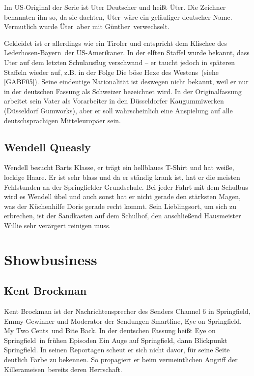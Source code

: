 Im US-Original der Serie ist Uter Deutscher und heißt Üter. Die Zeichner benannten ihn so, da sie dachten, \glqq Üter\grqq\ wäre ein geläufiger deutscher Name. Vermutlich wurde \glqq Üter\grqq\ aber mit \glqq Günther\grqq\ verwechselt.

Gekleidet ist er allerdings wie ein Tiroler und entspricht dem Klischee des \glqq Lederhosen-Bayern\grqq\ der US-Amerikaner. In der elften Staffel wurde bekannt, dass Uter auf dem letzten Schulausflug verschwand -- er taucht jedoch in späteren Staffeln wieder auf, z.B. in der Folge \glqq Die böse Hexe des Westens\grqq\ (siehe \ref{GABF05}). Seine eindeutige Nationalität ist deswegen nicht bekannt, weil er nur in der deutschen Fassung als Schweizer bezeichnet wird. In der Originalfassung arbeitet sein Vater als Vorarbeiter in den Düsseldorfer Kaugummiwerken (Düsseldorf Gumworks), aber er soll wahrscheinlich eine Anspielung auf alle deutschsprachigen Mitteleuropäer sein.

\subsection{Wendell Queasly}\label{WendellQueasly}
Wendell besucht Barts Klasse, er trägt ein hellblaues T-Shirt und hat weiße, lockige Haare. Er ist sehr blass und da er ständig krank ist, hat er die meisten Fehlstunden an der Springfielder Grundschule. Bei jeder Fahrt mit dem Schulbus wird es Wendell übel und auch sonst hat er nicht gerade den stärksten Magen, was der Küchenhilfe Doris gerade recht kommt. Sein Lieblingsort, um sich zu erbrechen, ist der Sandkasten auf dem Schulhof, den anschließend Hausmeister Willie sehr verärgert reinigen muss.

\section{Showbusiness}

\subsection{Kent Brockman}\label{KentBrockman}
Kent Brockman ist der Nachrichtensprecher des Senders Channel 6 in Springfield, Emmy-Gewinner und Moderator der Sendungen \glqq Smartline\grqq, \glqq Eye on Springfield\grqq, \glqq My Two Cents\grqq\ und \glqq Bite Back\grqq . In der deutschen Fassung heißt \glqq Eye on Springfield\grqq\ in frühen Episoden \glqq Ein Auge auf Springfield\grqq , dann \glqq Blickpunkt Springfield\grqq . In seinen Reportagen scheut er sich nicht davor, für seine Seite deutlich Farbe zu bekennen. So propagiert er beim vermeintlichen Angriff der \glqq Killerameisen\grqq\ bereits deren Herrschaft. 

